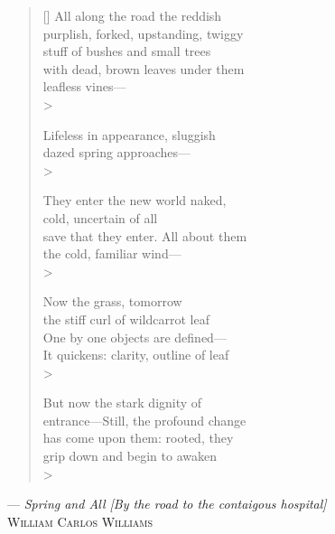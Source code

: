 \begin{vplace}
\settowidth{\versewidth}{It quickens: clarity, outline of leaf}
\begin{verse}[\versewidth]
    All along the road the reddish\\
    purplish, forked, upstanding, twiggy\\
    stuff of bushes and small trees\\
    with dead, brown leaves under them\\
    leafless vines—\\>
    
    Lifeless in appearance, sluggish\\
    dazed spring approaches—\\>
    
    They enter the new world naked,\\
    cold, uncertain of all\\
    save that they enter. All about them\\
    the cold, familiar wind—\\>
    
    Now the grass, tomorrow\\
    the stiff curl of wildcarrot leaf\\
    One by one objects are defined—\\
    It quickens: clarity, outline of leaf\\>
    
    But now the stark dignity of\\
    entrance—Still, the profound change\\
    has come upon them: rooted, they\\
    grip down and begin to awaken\\>   
\end{verse}
\begin{flushright}
    --- \textit{Spring and All [By the road to the contaigous hospital]}\\
    \textsc{William Carlos Williams}
\end{flushright}
\end{vplace}